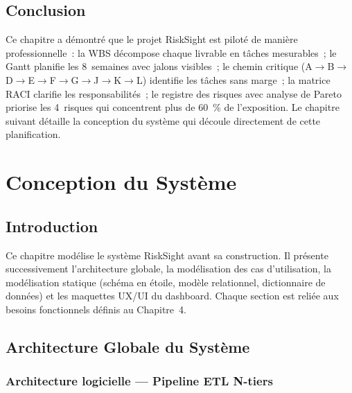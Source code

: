 \documentclass[12pt, a4paper]{report}
\begin{document}
\section{Conclusion}

Ce chapitre a démontré que le projet RiskSight est piloté de manière professionnelle~:
la WBS décompose chaque livrable en tâches mesurables~; le Gantt planifie les
8~semaines avec jalons visibles~; le chemin critique (A$\to$B$\to$D$\to$E$\to$F$\to$G$\to$J$\to$K$\to$L)
identifie les tâches sans marge~; la matrice RACI clarifie les responsabilités~; le
registre des risques avec analyse de Pareto priorise les 4~risques qui concentrent
plus de 60~\% de l'exposition. Le chapitre suivant détaille la conception du système
qui découle directement de cette planification.

\chapter{Conception du Système}

\section{Introduction}

Ce chapitre modélise le système RiskSight avant sa construction. Il présente
successivement l'architecture globale, la modélisation des cas d'utilisation,
la modélisation statique (schéma en étoile, modèle relationnel, dictionnaire
de données) et les maquettes UX/UI du dashboard. Chaque section est reliée
aux besoins fonctionnels définis au Chapitre~4.

\section{Architecture Globale du Système}

\subsection{Architecture logicielle --- Pipeline ETL N-tiers}
\end{document}
